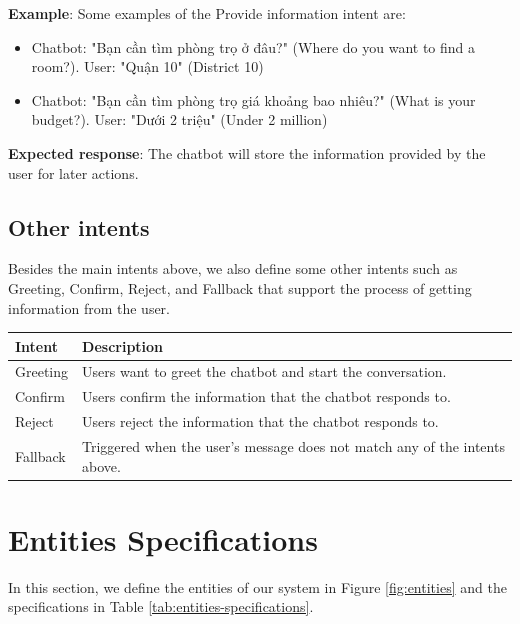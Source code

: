 \noindent \textbf{Example}: Some examples of the Provide information intent are:
\begin{itemize}
    \item Chatbot: "Bạn cần tìm phòng trọ ở đâu?" (Where do you want to find a room?). User: "Quận 10" (District 10)
    \item Chatbot: "Bạn cần tìm phòng trọ giá khoảng bao nhiêu?" (What is your budget?). User: "Dưới 2 triệu" (Under 2 million)
\end{itemize}

\noindent \textbf{Expected response}: The chatbot will store the information provided by the user for later actions.

\subsection{Other intents}
Besides the main intents above, we also define some other intents such as Greeting, Confirm, Reject, and Fallback that support the process of getting information from the user. 

{\renewcommand{\arraystretch}{1.75}%
\begin{table}[ht]
    \centering
    \begin{tabular}{|l|l|}
        \hline
        \textbf{Intent} & \textbf{Description} \\ \hline
        Greeting & Users want to greet the chatbot and start the conversation. \\ \hline
        Confirm & Users confirm the information that the chatbot responds to. \\ \hline
        Reject & Users reject the information that the chatbot responds to. \\ \hline
        Fallback & Triggered when the user's message does not match any of the intents above.  \\ \hline
    \end{tabular}
\end{table}}

\section{Entities Specifications}
In this section, we define the entities of our system in Figure \ref{fig:entities} and the specifications in Table \ref{tab:entities-specifications}.

